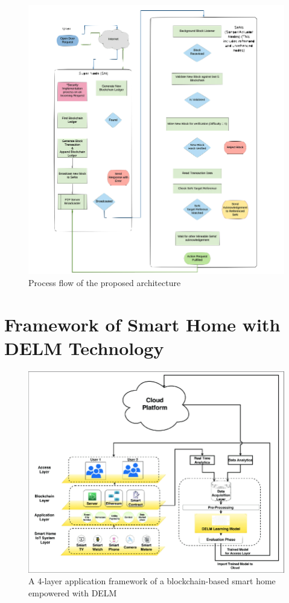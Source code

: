 \begin{appendices}
    \begin{figure}[ht!]
        \includegraphics[width=\linewidth]{datasets/images/A4}
        \caption{Process flow of the proposed architecture}\label{fig:figure7}
    \end{figure}

    \cleardoublepage
    \section{Framework of Smart Home with DELM Technology \cite{khanEtAl2021}}\label{sec:framework-of-smart-home-with-delm-technology}

    \begin{figure}[h!]
        \includegraphics[width=\linewidth]{datasets/images/A5}
        \caption{A 4-layer application framework of a blockchain-based smart home empowered with DELM}\label{fig:figure8}
    \end{figure}


\end{appendices}
